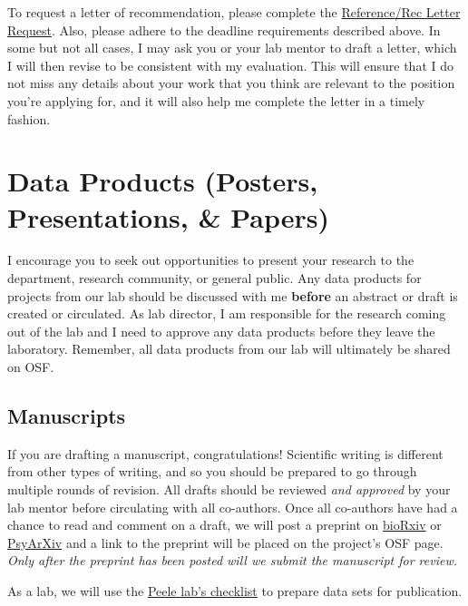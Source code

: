 \documentclass[]{book}
\begin{document}
To request a letter of recommendation, please complete the \href{https://docs.google.com/forms/d/1F_NeLFXH7F3mjJD0l_cS1RFaUSOPS_IdfeT4KvJvLgU/edit}{Reference/Rec Letter Request}. Also, please adhere to the deadline requirements described above. In some but not all cases, I may ask you or your lab mentor to draft a letter, which I will then revise to be consistent with my evaluation. This will ensure that I do not miss any details about your work that you think are relevant to the position you're applying for, and it will also help me complete the letter in a timely fashion.

\hypertarget{data-products-posters-presentations-papers}{%
\section{Data Products (Posters, Presentations, \& Papers)}\label{data-products-posters-presentations-papers}}

I encourage you to seek out opportunities to present your research to the department, research community, or general public. Any data products for projects from our lab should be discussed with me \textbf{before} an abstract or draft is created or circulated. As lab director, I am responsible for the research coming out of the lab and I need to approve any data products before they leave the laboratory. Remember, all data products from our lab will ultimately be shared on OSF.

\hypertarget{manuscripts}{%
\subsection{Manuscripts}\label{manuscripts}}

If you are drafting a manuscript, congratulations! Scientific writing is different from other types of writing, and so you should be prepared to go through multiple rounds of revision. All drafts should be reviewed \emph{and approved} by your lab mentor before circulating with all co-authors. Once all co-authors have had a chance to read and comment on a draft, we will post a preprint on \href{https://www.biorxiv.org/}{bioRxiv} or \href{https://psyarxiv.com/}{PsyArXiv} and a link to the preprint will be placed on the project's OSF page. \emph{Only after the preprint has been posted will we submit the manuscript for review.}

As a lab, we will use the \href{https://github.com/jpeelle/paperchecklist/blob/master/checklist.pdf}{Peele lab's checklist} to prepare data sets for publication.
\end{document}

